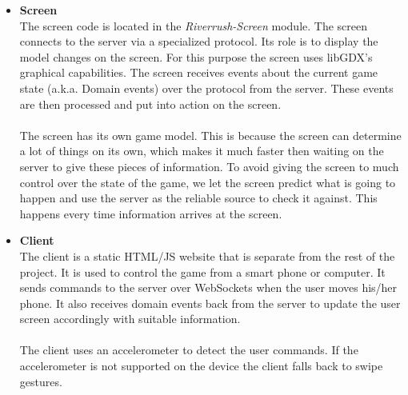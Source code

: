 \documentclass[11pt,a4paper]{article}
\begin{document}
\begin{itemize}
\item \textbf{Screen} \\
The screen code is located in the \emph{Riverrush-Screen} module. The screen connects to the server via a specialized protocol. Its role is to display the model changes on the screen. For this purpose the screen uses libGDX's graphical capabilities. The screen receives events about the current game state (a.k.a. Domain events) over the protocol from the server. These events are then processed and put into action on the screen.\\
\\
The screen has its own game model. This is because the screen can determine a lot of things on its own, which makes it much faster then waiting on the server to give these pieces of information. To avoid giving the screen to much control over the state of the game, we let the screen predict what is going to happen and use the server as the reliable source to check it against. This happens every time information arrives at the screen.

\item \textbf{Client} \\
The client is a static HTML/JS website that is separate from the rest of the project. It is used to control the game from a smart phone or computer. It sends commands to the server over WebSockets when the user moves his/her phone. It also receives domain events back from the server to update the user screen accordingly with suitable information.\\
\\
The client uses an accelerometer to detect the user commands. If the accelerometer is not supported on the device the client falls back to swipe gestures.


\end{itemize}
\end{document}
